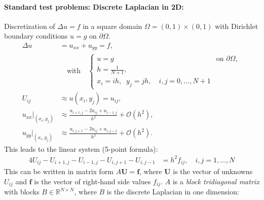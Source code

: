\paragraph{Standard test problems: Discrete Laplacian in 2D:}
Discretization of $\Delta u = f$ in a square domain $\Omega = (0,1) \times (0,1)$ with Dirichlet boundary conditions $u = g$ on $\partial \Omega$.
\begin{align*}
    \Delta u                 & = u_{xx} + u_{yy} = f,                                                  \\
                             & \quad \text{with} \quad
    \begin{cases}
        u = g & \text{on } \partial \Omega, \\
        h = \frac{1}{N + 1},                \\
        x_i = ih, \;\; y_j = jh, \quad i,j = 0, \ldots, N+1
    \end{cases}                                                 \\[1em]
    U_{ij}                   & \approx u(x_i, y_j) = u_{ij},                                           \\[0.5em]
    u_{xx}\big|_{(x_i, y_j)} & \approx \frac{u_{i+1,j} - 2u_{ij} + u_{i-1,j}}{h^2} + \mathcal{O}(h^2), \\[0.5em]
    u_{yy}\big|_{(x_i, y_j)} & \approx \frac{u_{i,j+1} - 2u_{ij} + u_{i,j-1}}{h^2} + \mathcal{O}(h^2).
\end{align*}
This leads to the linear system (5-point formula):
\begin{align*}
    4U_{ij} - U_{i+1,j} - U_{i-1,j} - U_{i,j+1} - U_{i,j-1} & = h^2 f_{ij}, \quad i,j = 1, \ldots, N
\end{align*}
This can be written in matrix form $A \mathbf{U} = \mathbf{f}$, where $\mathbf{U}$ is the vector of unknowns $U_{ij}$ and $\mathbf{f}$ is the vector of right-hand side values $f_{ij}$.
$A$ is a \emph{block tridiagonal matrix} with blocks $B \in \mathbb{R}^{N \times N}$, where $B$ is the discrete Laplacian in one dimension:

